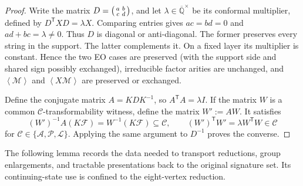\documentclass[11pt,letterpaper,onecolumn]{article}
\theoremstyle{plain}
\theoremstyle{definition}
\theoremstyle{remark}
\newcommand{\AlgNums}{\overline{\mathbb Q}}
\newcommand{\cF}{\mathcal F}
\newcommand{\cA}{\mathscr A}
\newcommand{\cP}{\mathscr P}
\newcommand{\cL}{\mathscr L}
\newcommand{\cM}{\mathscr M}
\newcommand{\cC}{\mathscr C}
\newcommand{\angles}[1]{\left\langle #1\right\rangle}
\begin{document}
\begin{proof}
Write the matrix \(D=\begin{psmallmatrix}a&b\\ c&d\end{psmallmatrix}\), and
let \(\lambda\in\AlgNums^\times\) be its conformal multiplier, defined by
\(D^{\mathsf T}XD=\lambda X\).  Comparing entries gives
\(ac=bd=0\) and \(ad+bc=\lambda\ne0\).  Thus \(D\) is diagonal or
anti-diagonal.  The former preserves every string in the support. The latter
complements it. On a fixed layer its multiplier is constant.  Hence the two
EO cases are preserved (with the support side and shared sign
possibly exchanged), irreducible factor arities are unchanged, and
\(\angles{\cM}\) and \(\angles{X\cM}\) are preserved or exchanged.

Define the conjugate matrix \(A=KDK^{-1}\), so
\(A^{\mathsf T}A=\lambda I\).  If the matrix \(W\) is a common
\(\cC\)-transformability witness, define the matrix
\(W':=AW\).  It satisfies
\[
  (W')^{-1}A(K\cF)=W^{-1}(K\cF)\subseteq\cC,
  \qquad
  (W')^{\mathsf T}W'
  =\lambda W^{\mathsf T}W\in\cC
\]
for \(\cC\in\{\cA,\cP,\cL\}\).  Applying the same argument to \(D^{-1}\)
proves the converse.
\end{proof}

The following lemma records the data needed to transport reductions,
group enlargements, and tractable presentations back to the original
signature set. Its continuing-state use is confined to the eight-vertex
reduction.
\end{document}
